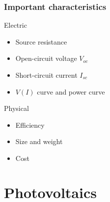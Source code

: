 \documentclass{beamer}
\begin{document}
\begin{frame}
  \frametitle{Important characteristics}
\begin{block}{Electric}
\begin{itemize}
  \item Source resistance
  \item Open-circuit voltage $V_{oc}$
  \item Short-circuit current $I_{sc}$
  \item $V(I)$ curve and power curve
\end{itemize}
\end{block}

\begin{block}{Physical}
\begin{itemize}
  \item Efficiency
  \item Size and weight
  \item Cost
\end{itemize}
\end{block}

\end{frame}

\section{Photovoltaics}
\end{document}
